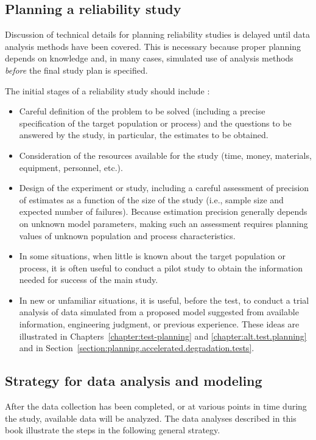 \subsection{Planning a reliability study}
Discussion of technical details for planning reliability studies is
delayed until data analysis methods have been covered. This is necessary
because proper planning depends on knowledge and, in many cases,
simulated use of analysis methods {\em before} the final study plan is
specified.

The initial stages of a reliability study should include :
\begin{itemize}
\item
Careful definition of the problem to be solved (including a precise
specification of the target population or process) and the questions
to be answered by the study, in particular, the estimates to be
obtained.
\item
Consideration of the resources available for the study
(time, money, materials, equipment, personnel, etc.).
\item
Design of the experiment or study, including a careful assessment of
precision of estimates as a function of the size of the study (i.e.,
sample size and expected number of failures). Because estimation
precision generally depends on unknown model parameters, making such
an assessment requires planning values of unknown population and
process characteristics.
\item
In some situations, when little is known about the target population
or process, it is often useful to conduct a pilot study to obtain the
information needed for success of the main study.
\item
In new or unfamiliar situations, it is useful, before the test, to
conduct a trial analysis of data simulated from a proposed model
suggested from available information, engineering judgment, or
previous experience.  These ideas are illustrated in
Chapters~\ref{chapter:test-planning} and
\ref{chapter:alt.test.planning} and 
in Section~\ref{section:planning.accelerated.degradation.tests}.
\end{itemize}

\subsection{Strategy for data analysis and modeling}
\label{section:strategy.for.data.analysis}
After the data collection has been completed, or at various points
in time during the study, available data will be analyzed.
The data analyses
described in this book illustrate the steps in 
the following general strategy.

